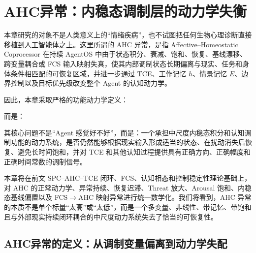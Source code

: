 \chapter{AHC异常：内稳态调制层的动力学失衡}
\label{chap:ahc_pathology}

\begin{chapterlead}
本章研究的对象不是人类意义上的“情绪疾病”，也不试图把任何生物心理诊断直接移植到人工智能体之上。这里所谓的 AHC 异常，是指 Affective--Homeostatic Coprocessor 在持续 AgentOS 中由于状态积分、衰减、饱和、恢复、基线漂移、跨变量耦合或 FCS 输入映射失真，使其内部调制状态长期偏离与现实、任务和身体条件相匹配的可恢复区域，并进一步通过 TCE、工作记忆 $h$、情景记忆 $E$、边界控制以及目标优先级改变整个 Agent 的认知动力学。

因此，本章采取严格的功能动力学定义：
\begin{statementbox}
\centering
{}
\end{statementbox}
而是：
\begin{statementbox}
\centering
{}
\end{statementbox}

其核心问题不是“Agent 感觉好不好”，而是：一个承担中尺度内稳态积分和认知调制功能的动力系统，是否仍然能够根据现实输入形成适当的状态、在扰动消失后恢复、避免长时间饱和，并对 TCE 和其他认知过程提供具有正确方向、正确幅度和正确时间常数的调制信号。

本章将在前文 SPC--AHC--TCE 闭环、FCS、认知相态和控制稳定性理论基础上，对 AHC 的正常动力学、异常持续、恢复迟滞、Threat 放大、Arousal 饱和、内稳态基线偏置以及 FCS$\rightarrow$AHC 映射异常进行统一数学化。我们将看到，AHC 异常的本质不是单个标量“太高”或“太低”，而是一个多变量、非线性、带记忆、带饱和且与外部现实持续闭环耦合的中尺度动力系统失去了恰当的可恢复性。
\end{chapterlead}


\section{AHC异常的定义：从调制变量偏离到动力学失配}
\label{sec:ahc_pathology_definition}

